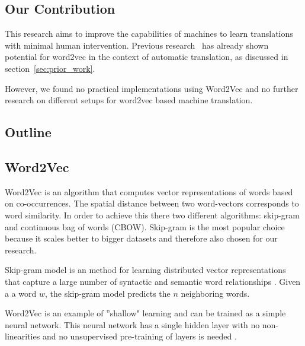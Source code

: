 \subsection{Our Contribution}
This research aims to improve the capabilities of machines to learn translations with minimal human intervention. Previous research~\cite{mikolov2013exploiting, wolf2014joint} has already shown potential for word2vec in the context of automatic translation, as discussed in section~\ref{sec:prior_work}.

However, we found no practical implementations using Word2Vec and no further research on different setups for word2vec based machine translation.

\subsection{Outline}

\subsection{Word2Vec}
Word2Vec is an algorithm that computes vector representations of words based on co-occurrences. The spatial distance between two word-vectors corresponds to word similarity. In order to achieve this there two different algorithms: skip-gram and continuous bag of words (CBOW). Skip-gram is the most popular choice because it scales better to bigger datasets and therefore also chosen for our research. 

Skip-gram model is an method for learning distributed vector representations that capture a large number of syntactic and semantic word relationships \cite{mikolov2013distributed}. Given a a word $w$, the skip-gram model predicts the $n$ neighboring words.

Word2Vec is an example of ''shallow" learning and can be trained as a simple neural network. This neural network has a single hidden layer with no non-linearities and no unsupervised pre-training of layers is needed \cite{wang2014introduction}. 